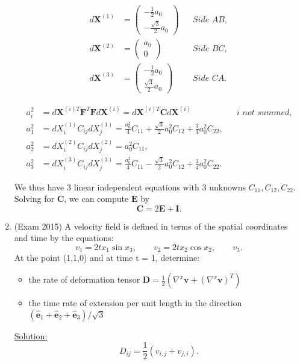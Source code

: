 \documentclass{article}
\newcommand{\ee}{\end{equation}}
\newcommand{\be}{\begin{equation}}
\newcommand{\bi}{\begin{itemize}}
\newcommand{\ei}{\end{itemize}}
\newcommand{\bs}{\boldsymbol}
\begin{document}
\begin{enumerate}
\begin{align}
d\bs X^{(1)} &= 
\begin{pmatrix}
-\frac{1}{2} a_0\\
-\frac{\sqrt{3}}{2} a_0
\end{pmatrix}
&&\textit{Side $AB$}, \\
d\bs X^{(2)} &= 
\begin{pmatrix}
 a_0\\
0
\end{pmatrix}
&&\textit{Side $BC$}, \\
d\bs X^{(3)} &= 
\begin{pmatrix}
-\frac{1}{2} a_0\\
\frac{\sqrt{3}}{2} a_0
\end{pmatrix}
&&\textit{Side $CA$}.
\end{align}

\begin{align}
a_i^2 &= d\bs X^{(i)T} \bs F^T \bs F d \bs X^{(i)} = d\bs X^{(i)T} \bs C d \bs X^{(i)} && \textit{$i$ not summed,} \\
a_1^2 &= dX_i^{(1)} C_{ij}dX_j^{(1)} = \frac{a_0^2}{4} C_{11} + \frac{\sqrt{3}}{2} a_0^2 C_{12} + \frac{3}{4} a_0^2 C_{22}, && \\
a_2^2 &= dX_i^{(2)} C_{ij} dX_j^{(2)} = a_0^2 C_{11}, && \\
a_3^2 &=dX_i^{(3)} C_{ij} dX_j^{(3)} = \frac{a_0^2}{4}C_{11} - \frac{\sqrt{3}}{2}a_0^2 C_{12} + \frac{3}{4}a_0^2 C_{22}.
\end{align}

We thus have 3 linear independent equations with 3 unknowns $C_{11},C_{12}, C_{22}$. Solving for $\bs C$, we can compute $\bs E$ by
\be
\bs C = 2\bs E + \bs I.
\ee

\item  (Exam 2015) A velocity field is defined in terms of the spatial coordinates and time by the
equations:
\be
v_1 = 2tx_1 \sin x_3, \qquad v_2 = 2tx_2 \cos x_2, \qquad v_3.
\ee
At the point (1,1,0) and at time t = 1, determine:
\bi
\item the rate of deformation tensor $\bs D = \frac{1}{2}(\nabla^x \bs v + (\nabla^x \bs v)^T)$
\item the time rate of extension per unit length in the direction $(\hat{\bs e}_1 + \hat{\bs e}_2 + \hat{\bs e}_3)/\sqrt{3}$
\ei

\underline{Solution:}
\be
D_{ij} = \frac{1}{2}(v_{i,j} + v_{j,i}).
\ee


\end{enumerate}
\end{document}
